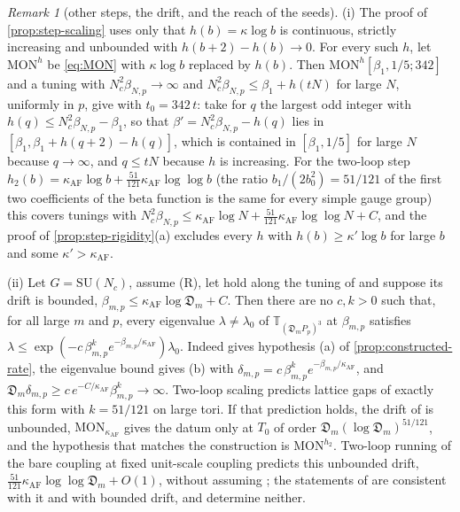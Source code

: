 \documentclass[11pt,a4paper]{amsart}
\theoremstyle{definition}
\theoremstyle{remark}
\newtheorem{remark}[theorem]{Remark}
\numberwithin{equation}{section}
\newcommand{\SU}{\mathrm{SU}}              %
\newcommand{\TT}{\mathbb{T}}               %
\newcommand{\lzero}{\lambda_0}             %
\newcommand{\Mcirc}{\text{\upshape(M$^{\circ}$)}}   %
\newcommand{\tzero}{t_0}                   %
\newcommand{\Tzero}{T_0}                   %
\newcommand{\betaNp}{\beta_{N,p}}          %
\newcommand{\Den}{\mathfrak D}            %
\begin{document}
\begin{remark}[other steps, the drift, and the reach of the seeds]\label{rem:step-general}
(i) The proof of \cref{prop:step-scaling} uses only that $h(b)=\kappa\log b$ is continuous, strictly increasing and unbounded with $h(b+2)-h(b)\to0$. For every such $h$, let $\mathrm{MON}^h$ be \eqref{eq:MON} with $\kappa\log b$ replaced by $h(b)$. Then $\mathrm{MON}^h[\beta_1,1/5;342]$ and a tuning with $N_c^2\betaNp\to\infty$ and $N_c^2\betaNp\le\beta_1+h(tN)$ for large $N$, uniformly in $p$, give \Mcirc{} with $\tzero=342\,t$: take for $q$ the largest odd integer with $h(q)\le N_c^2\betaNp-\beta_1$, so that $\beta'=N_c^2\betaNp-h(q)$ lies in $[\beta_1,\beta_1+h(q+2)-h(q)]$, which is contained in $[\beta_1,1/5]$ for large $N$ because $q\to\infty$, and $q\le tN$ because $h$ is increasing. For the two-loop step $h_2(b)=\kappa_{\mathrm{AF}}\log b+\frac{51}{121}\kappa_{\mathrm{AF}}\log\log b$ (the ratio $b_1/(2b_0^2)=51/121$ of the first two coefficients of the beta function is the same for every simple gauge group) this covers tunings with $N_c^2\betaNp\le\kappa_{\mathrm{AF}}\log N+\frac{51}{121}\kappa_{\mathrm{AF}}\log\log N+C$, and the proof of \cref{prop:step-rigidity}(a) excludes every $h$ with $h(b)\ge\kappa'\log b$ for large $b$ and some $\kappa'>\kappa_{\mathrm{AF}}$.

(ii) Let $G=\SU(N_c)$, assume \textup{(R)}, let \Mcirc{} hold along the tuning of \cite{openaiym} and suppose its drift is bounded, $\beta_{m,p}\le\kappa_{\mathrm{AF}}\log \Den_m+C$. Then there are no $c,k>0$ such that, for all large $m$ and $p$, every eigenvalue $\lambda\ne\lzero$ of $\TT_{(\Den_mP_p)^3}$ at $\beta_{m,p}$ satisfies $\lambda\le\exp(-c\,\beta_{m,p}^ke^{-\beta_{m,p}/\kappa_{\mathrm{AF}}})\lzero$. Indeed \Mcirc{} gives hypothesis (a) of \cref{prop:constructed-rate}, the eigenvalue bound gives (b) with $\delta_{m,p}=c\,\beta_{m,p}^ke^{-\beta_{m,p}/\kappa_{\mathrm{AF}}}$, and $\Den_m\delta_{m,p}\ge c\,e^{-C/\kappa_{\mathrm{AF}}}\beta_{m,p}^k\to\infty$. Two-loop scaling predicts lattice gaps of exactly this form with $k=51/121$ on large tori. If that prediction holds, the drift of \cite{openaiym} is unbounded, $\mathrm{MON}_{\kappa_{\mathrm{AF}}}$ gives the datum only at $\Tzero$ of order $\Den_m(\log \Den_m)^{51/121}$, and the hypothesis that matches the construction is $\mathrm{MON}^{h_2}$. Two-loop running of the bare coupling at fixed unit-scale coupling predicts this unbounded drift, $\frac{51}{121}\kappa_{\mathrm{AF}}\log\log \Den_m+O(1)$, without assuming \Mcirc; the statements of \cite{openaiym} are consistent with it and with bounded drift, and determine neither.


\end{remark}
\end{document}
